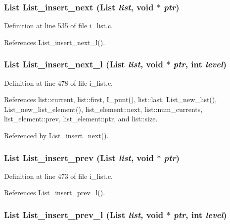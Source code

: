 \subsubsection{\setlength{\rightskip}{0pt plus 5cm}\bf{List} List\_\-insert\_\-next (\bf{List} {\em list}, void $\ast$ {\em ptr})}\label{i__list_8h_07de90b64e7e042feb063db108e75103}




Definition at line 535 of file i\_\-list.c.

References List\_\-insert\_\-next\_\-l().
\subsubsection{\setlength{\rightskip}{0pt plus 5cm}\bf{List} List\_\-insert\_\-next\_\-l (\bf{List} {\em list}, void $\ast$ {\em ptr}, int {\em level})}\label{i__list_8h_ca60b026c6cd5d0f17f3154d7fc1d7c7}




Definition at line 478 of file i\_\-list.c.

References list::current, list::first, I\_\-punt(), list::last, List\_\-new\_\-list(), List\_\-new\_\-list\_\-element(), list\_\-element::next, list::num\_\-currents, list\_\-element::prev, list\_\-element::ptr, and list::size.

Referenced by List\_\-insert\_\-next().
\subsubsection{\setlength{\rightskip}{0pt plus 5cm}\bf{List} List\_\-insert\_\-prev (\bf{List} {\em list}, void $\ast$ {\em ptr})}\label{i__list_8h_be307e7f9cba458db32c616840300275}




Definition at line 473 of file i\_\-list.c.

References List\_\-insert\_\-prev\_\-l().
\subsubsection{\setlength{\rightskip}{0pt plus 5cm}\bf{List} List\_\-insert\_\-prev\_\-l (\bf{List} {\em list}, void $\ast$ {\em ptr}, int {\em level})}\label{i__list_8h_e649a7989eae772ed2793b561b0fa937}




